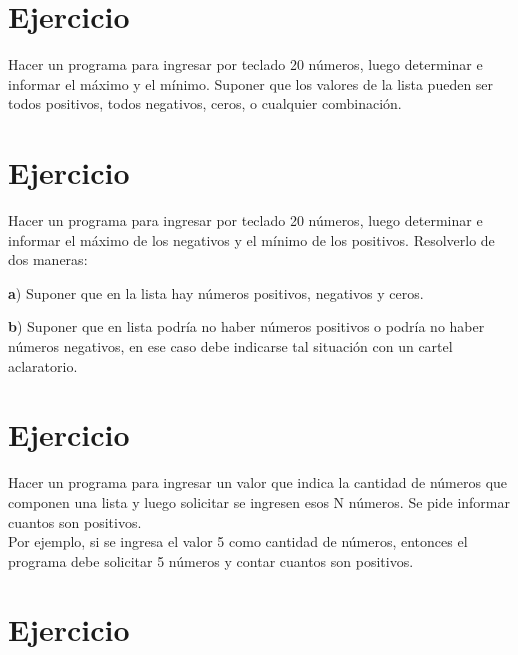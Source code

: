 \documentclass[12pt,a4paper,twoside]{article}
\begin{document}
\newpage

\section{Ejercicio }

\hspace*{1cm}Hacer un programa para ingresar por teclado 20 números, luego determinar e informar el máximo y el mínimo. Suponer que los valores de la lista pueden ser todos positivos, todos negativos, ceros, o cualquier combinación. 

\newpage

\section{Ejercicio }

\hspace*{1cm} Hacer un programa para ingresar por teclado 20 números, luego determinar e informar el máximo de los negativos y el mínimo de los positivos. Resolverlo de dos maneras:
\begin{list}{•}{}
\item \textbf{a}) Suponer que en la lista hay números positivos, negativos y ceros. 
\item \textbf{b}) Suponer que en lista podría no haber números positivos o podría no haber números negativos, en ese caso debe indicarse tal situación con un cartel aclaratorio.
\end{list}

\newpage

\section{Ejercicio }

\hspace*{1cm}Hacer un programa para ingresar un valor que indica la cantidad de números que componen una lista y luego solicitar se ingresen esos N números. Se pide informar cuantos son positivos.\\
Por ejemplo, si se ingresa el valor 5 como cantidad de números, entonces el programa debe solicitar 5 números y contar cuantos son positivos. 

\newpage

\section{Ejercicio }
\end{document}

